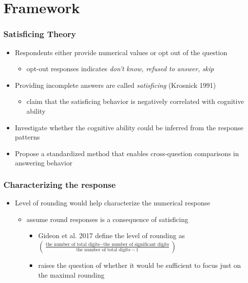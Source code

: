 \documentclass[10pt,svgnames,fragile]{beamer}
\begin{document}
{
	\AtBeginSection{}
	\section{Framework}
	\begin{frame}
		\frametitle{Satisficing Theory} 
		\begin{itemize}
			\item Respondents either provide numerical values or opt out of the question
					\begin{itemize}
						\vspace{2 mm}
				\item opt-out responses indicates \textit{don't know, refused to answer, skip}
			\end{itemize}
				\vfill
			\item Providing incomplete answers are called \textit{satisficing} (Krosnick 1991)
			\begin{itemize}
				\vspace{2 mm}
				\item claim that the satisficing behavior is negatively correlated with cognitive ability
			\end{itemize}
			\vfill
		\item Investigate whether the cognitive ability could be inferred from the response patterns
			\vfill
		\item Propose a standardized method that enables cross-question comparisons in answering behavior
			\vfill
	\end{itemize}
	\end{frame}

	\begin{frame}[label=Framework2]
	\frametitle{Characterizing the response} 
	\begin{itemize}
		\item Level of rounding would help characterize the numerical response
	\begin{itemize}
		\item assume round responses is a consequence of satisficing
		\begin{itemize}
			\item Gideon et al. 2017 define the level of rounding as $\left( \frac{\text{the number of total digits}-\text{the number of significant digits}}{\text{the number of total digits}-1} \right)$  	\hyperlink{figure2}{\beamerbutton{figure}}
			\vspace{2 mm}
			\item raises the question of whether it would be sufficient to focus just on the maximal rounding \hyperlink{figure3}{\beamerbutton{figure}}


\end{itemize}
\end{itemize}
\end{itemize}
\end{frame}}
\end{document}
